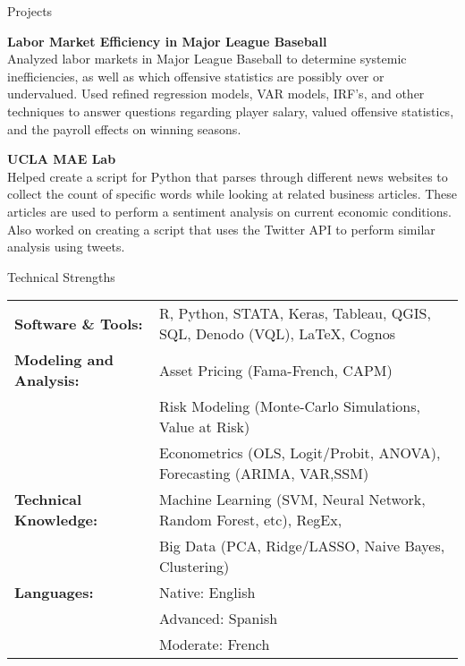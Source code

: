 \documentclass{resume} %
\begin{document}
\begin{rSection}{Projects}

{\bf Labor Market Efficiency in Major League Baseball}\\
Analyzed labor markets in Major League Baseball to determine systemic inefficiencies, as well as which offensive statistics are possibly over or undervalued. Used refined regression models, VAR models, IRF's, and other techniques to answer questions regarding player salary, valued offensive statistics, and the payroll effects on winning seasons. 

{\bf UCLA MAE Lab}\\
 Helped create a script for Python that parses through different news websites to collect the count of specific words while looking at related business articles. These articles are used to perform a sentiment analysis on current economic conditions. Also worked on creating a script that uses the Twitter API to perform similar analysis using tweets. 

\end{rSection}


\begin{rSection}{Technical Strengths}

\begin{tabular}{ @{} >{\bfseries}l @{\hspace{6ex}} l }
Software \& Tools: & R, Python, STATA, Keras, Tableau, QGIS, SQL, Denodo (VQL), LaTeX, Cognos\\
Modeling and Analysis: \ & Asset Pricing (Fama-French, CAPM)\\
\ & Risk Modeling (Monte-Carlo Simulations, Value at Risk)\\
\ & Econometrics (OLS, Logit/Probit, ANOVA), Forecasting (ARIMA, VAR,SSM)\\
Technical Knowledge: \ &  Machine Learning (SVM, Neural Network, Random Forest, etc), RegEx, \\
\ & Big Data (PCA, Ridge/LASSO, Naive Bayes, Clustering)\\
Languages: \ &  Native: English \\
\ & Advanced: Spanish \\
\ & Moderate: French \\
\end{tabular}

\end{rSection}
\end{document}
